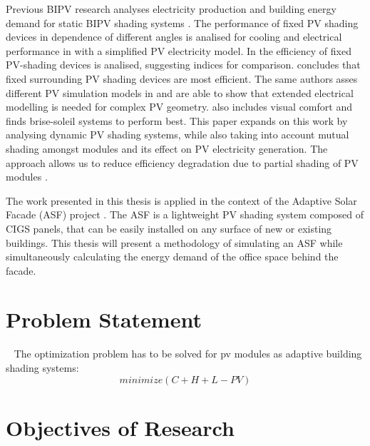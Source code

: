 	Previous BIPV research analyses electricity production and building energy demand for static BIPV shading systems \cite{sun2010} \cite{mandalaki2012assessment} \cite{Mandalaki2014complexPV} \cite{mandalaki2014assessment}  \cite{yoo2011available} \cite{freitas2015maximizing} \cite{jayathissa2015abs}. The performance of fixed PV shading devices in dependence of different angles is analised for cooling and electrical performance in \cite{sun2010} with a simplified PV electricity model. In \cite{David2011} the efficiency of fixed PV-shading devices is analised, suggesting indices for comparison. \cite{mandalaki2012assessment} concludes that fixed surrounding PV shading devices are most efficient. The same authors asses different PV simulation models in \cite{Mandalaki2014complexPV} and are able to show that extended electrical modelling is needed for complex PV geometry. \cite{mandalaki2014assessment} also includes visual comfort and finds brise-soleil systems to perform best. This paper expands on this work by analysing dynamic PV shading systems, while also taking into account mutual shading amongst modules and its effect on PV electricity generation. The approach allows us to reduce efficiency degradation due to partial shading of PV modules \cite{hofer2015PVSEC}.

	The work presented in this thesis is applied in the context of the Adaptive Solar Facade (ASF) project \cite{nagy2015frontiers}. The ASF is a lightweight PV shading system composed of CIGS panels, that can be easily installed on any surface of new or existing buildings. This thesis will present a methodology of simulating an ASF while simultaneously calculating the energy demand of the office space behind the facade.


\section{Problem Statement}\
	The optimization problem has to be solved for pv modules as adaptive building shading systems:\\
	\begin{equation}
			minimize(C+H+L-PV)
	      	\label{e:minimize}
	\end{equation}



\section{Objectives of Research}\

